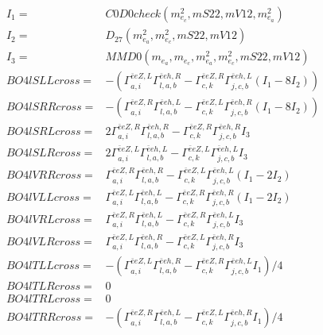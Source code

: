 \documentclass[A4,landscape]{article}
\begin{document}
\begin{align} 
I_1 = & C0D0check(m^2_{e_{{c}}}, mS22, mV12, m^2_{e_{{a}}}) \\ 
I_2 = & D_{27}(m^2_{e_{{a}}}, m^2_{e_{{c}}}, mS22, mV12) \\ 
I_3 = & MMD0(m_{e_{{a}}}, m_{e_{{c}}}, m^2_{e_{{a}}}, m^2_{e_{{c}}}, mS22, mV12) \\ 
  BO4lSLLcross= & -( \Gamma^{\bar{e}e Z ,L}_{a, i} \Gamma^{\bar{e}e h ,R}_{l, a, b} - \Gamma^{\bar{e}e Z ,R} _{c, k} \Gamma^{\bar{e}e h ,L}_{j, c, b} (I_1 - 8 I_2)) \\ 
  BO4lSRRcross= & -( \Gamma^{\bar{e}e Z ,R}_{a, i} \Gamma^{\bar{e}e h ,L}_{l, a, b} - \Gamma^{\bar{e}e Z ,L} _{c, k} \Gamma^{\bar{e}e h ,R}_{j, c, b} (I_1 - 8 I_2)) \\ 
  BO4lSRLcross= & 2  \Gamma^{\bar{e}e Z ,R}_{a, i} \Gamma^{\bar{e}e h ,R}_{l, a, b} - \Gamma^{\bar{e}e Z ,R} _{c, k} \Gamma^{\bar{e}e h ,R}_{j, c, b} I_3 \\ 
  BO4lSLRcross= & 2  \Gamma^{\bar{e}e Z ,L}_{a, i} \Gamma^{\bar{e}e h ,L}_{l, a, b} - \Gamma^{\bar{e}e Z ,L} _{c, k} \Gamma^{\bar{e}e h ,L}_{j, c, b} I_3 \\ 
  BO4lVRRcross= &  \Gamma^{\bar{e}e Z ,R}_{a, i} \Gamma^{\bar{e}e h ,R}_{l, a, b} - \Gamma^{\bar{e}e Z ,L} _{c, k} \Gamma^{\bar{e}e h ,L}_{j, c, b} (I_1 - 2 I_2) \\ 
  BO4lVLLcross= &  \Gamma^{\bar{e}e Z ,L}_{a, i} \Gamma^{\bar{e}e h ,L}_{l, a, b} - \Gamma^{\bar{e}e Z ,R} _{c, k} \Gamma^{\bar{e}e h ,R}_{j, c, b} (I_1 - 2 I_2) \\ 
  BO4lVRLcross= &  \Gamma^{\bar{e}e Z ,R}_{a, i} \Gamma^{\bar{e}e h ,L}_{l, a, b} - \Gamma^{\bar{e}e Z ,R} _{c, k} \Gamma^{\bar{e}e h ,L}_{j, c, b} I_3 \\ 
  BO4lVLRcross= &  \Gamma^{\bar{e}e Z ,L}_{a, i} \Gamma^{\bar{e}e h ,R}_{l, a, b} - \Gamma^{\bar{e}e Z ,L} _{c, k} \Gamma^{\bar{e}e h ,R}_{j, c, b} I_3 \\ 
  BO4lTLLcross= & -( \Gamma^{\bar{e}e Z ,L}_{a, i} \Gamma^{\bar{e}e h ,R}_{l, a, b} - \Gamma^{\bar{e}e Z ,R} _{c, k} \Gamma^{\bar{e}e h ,L}_{j, c, b} I_1)/4 \\ 
  BO4lTLRcross= & 0 \\ 
  BO4lTRLcross= & 0 \\ 
  BO4lTRRcross= & -( \Gamma^{\bar{e}e Z ,R}_{a, i} \Gamma^{\bar{e}e h ,L}_{l, a, b} - \Gamma^{\bar{e}e Z ,L} _{c, k} \Gamma^{\bar{e}e h ,R}_{j, c, b} I_1)/4 \\ 
\end{align} 
\end{document}
